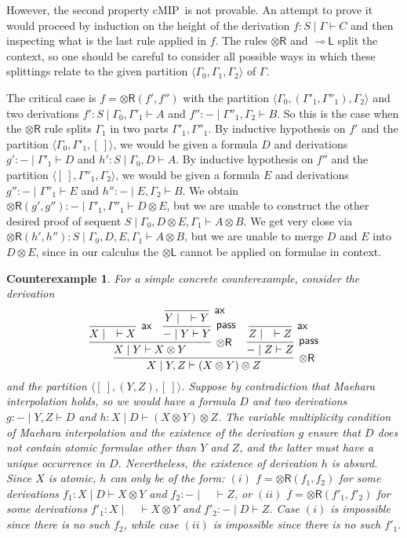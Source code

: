 \documentclass[sn-mathphys-num]{sn-jnl}%
\newcommand{\GG}{\Gamma}
\newcommand{\vd}{\vdash}
\newcommand{\tl}{\otimes \mathsf{L}}
\newcommand{\tr}{\otimes\mathsf{R}}
\newcommand{\pass}{\mathsf{pass}}
\newcommand{\ax}{\mathsf{ax}}
\newcommand{\ot}{\otimes}
\newcommand{\lolli}{\multimap}
\newcommand{\lleft}{{\lolli}\mathsf{L}}
\newcommand{\cMIP}{\textsf{cMIP}}
\theoremstyle{thmstyleone}%
\theoremstyle{thmstyletwo}%
\newtheorem{counterexample}[theorem]{Counterexample}
\theoremstyle{thmstylethree}%
\begin{document}
However, the second property \cMIP~is not provable. An attempt to prove it would proceed by induction on the height of the derivation $f : S \mid \GG \vdash C$ and then inspecting what is the last rule applied in $f$. The rules $\tr$ and $\lleft$ split the context, so one should be careful to consider all possible ways in which these splittings relate to the given partition $\langle \GG_0,\GG_1, \GG_2 \rangle$ of $\GG$.

The critical case is $f = \tr (f',f'')$ with the partition $\langle \GG_0, (\GG'_1, \GG''_1), \GG_2\rangle$ and two derivations $f' : S \mid \GG_0 , \GG'_1 \vd A$ and $f'' : {-} \mid \GG''_1 , \GG_2 \vd B$. So this is the case when the $\tr$ rule splits $\GG_1$ in two parts $\GG'_1,\GG''_1$.
By inductive hypothesis on $f'$ and the partition $\langle \GG_0 , \GG'_1, [\ ] \rangle$, we would be given a formula $D$ and derivations $g' : {-} \mid \GG'_1 \vd D$ and $h': S \mid \GG_0 , D \vd A$. By inductive hypothesis on $f''$ and the partition $\langle [\ ], \GG''_1, \GG_2\rangle$, we would be given a formula $E$ and derivations $g'' : {-} \mid \GG''_1 \vd E$ and $h'': {-} \mid E, \GG_2 \vd B$.
We obtain $\tr (g',g'') : {-} \mid \GG'_1, \GG''_1 \vd D \ot E$, but we are unable to construct the other desired proof of sequent $S \mid \GG_0, D \ot E, \GG_1 \vd A \ot B$. We get very close via $\tr (h', h'') : S \mid \GG_0, D, E, \GG_1 \vd A \ot B$, but we are unable to merge $D$ and $E$ into $D \ot E$, since in our calculus the $\tl$ cannot be applied on formulae in context.
\begin{counterexample}\label{example:counterexample:cMIP}
  For a simple concrete counterexample, consider the derivation
\begin{equation*}
  \infer[\tr]{X \mid Y, Z \vd (X\ot Y)\ot Z}{
  \infer[\tr]{X \mid Y \vd X \ot Y}{
  \infer[\ax]{X \mid \quad \vd X}{}
  &
  \infer[\pass]{{-} \mid Y \vd Y}{
  \infer[\ax]{Y \mid \quad \vd Y}{}
  }
  }
  &
  \infer[\pass]{{-} \mid Z \vd Z}{
  \infer[\ax]{Z \mid \quad \vd Z}{}
  }
  }
\end{equation*}
and the partition $\langle [\ ], (Y,Z), [\ ]\rangle$. Suppose by contradiction that Maehara interpolation holds, so we would have a formula $D$ and two derivations $g: {-} \mid Y, Z \vd D$ and $h : X \mid D \vd (X\ot Y)\ot Z$.
The variable multiplicity condition of Maehara interpolation and the existence of the derivation $g$ ensure that $D$ does not contain atomic formulae other than $Y$ and $Z$, and the latter must have a unique occurrence in $D$. Nevertheless, the existence of derivation $h$ is absurd. Since $X$ is atomic, $h$ can only be of the form: $(i)$ $f = \tr(f_1,f_2)$ for some derivations $f_1 : X \mid D \vd X \ot Y$ and $f_2 : {-} \mid \quad \vd Z$, or $(ii)$ $f = \tr(f'_1,f'_2)$ for some derivations $f'_1 : X \mid \quad \vd X \ot Y$ and $f'_2 : {-} \mid D \vd Z$. Case $(i)$ is impossible since there is no such $f_2$, while case $(ii)$ is impossible since there is no such $f'_1$.
\end{counterexample}
\end{document}
